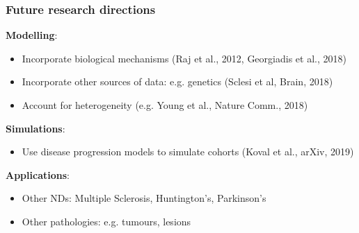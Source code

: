 \documentclass[8pt,xcolor=table]{beamer}
\begin{document}
\begin{frame}[label=current]
\frametitle{Future research directions}

\textbf{Modelling}:
\begin{itemize}
\item Incorporate biological mechanisms (Raj et al., 2012,  Georgiadis et al., 2018)
\item Incorporate other sources of data: e.g. genetics (Sclesi et al, Brain, 2018)
\item Account for heterogeneity (e.g. Young et al., Nature Comm., 2018)
\end{itemize}

\vfill

\textbf{Simulations}: 
\begin{itemize}
\item Use disease progression models to simulate cohorts (Koval et al., arXiv, 2019)
\end{itemize}

\vfill

\textbf{Applications}:
\begin{itemize}
\item Other NDs: Multiple Sclerosis, Huntington's, Parkinson's
\item Other pathologies: e.g. tumours, lesions
\end{itemize}

\end{frame}


% 
% 
% 
% 
% 
% 
% 
\end{document}
